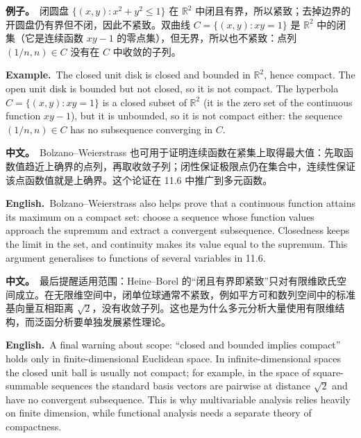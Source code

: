 \documentclass[UTF8,11pt,a4paper]{ctexart}
\newcommand{\BOTH}[2]{\par\noindent\textbf{中文。}\ #1\par\noindent\textbf{English.}\ #2\par}
\newcommand{\EX}[2]{\par\noindent\textbf{例子。}\ #1\par\noindent\textbf{Example.}\ #2\par}
\begin{document}
\EX{闭圆盘 $\{(x,y):x^2+y^2\le1\}$ 在 $\mathbb R^2$ 中闭且有界，所以紧致；去掉边界的开圆盘仍有界但不闭，因此不紧致。双曲线 $C=\{(x,y):xy=1\}$ 是 $\mathbb R^2$ 中的闭集（它是连续函数 $xy-1$ 的零点集），但无界，所以也不紧致：点列 $(1/n,n)\in C$ 没有在 $C$ 中收敛的子列。}{The closed unit disk is closed and bounded in $\mathbb R^2$, hence compact. The open unit disk is bounded but not closed, so it is not compact. The hyperbola $C=\{(x,y):xy=1\}$ is a closed subset of $\mathbb R^2$ (it is the zero set of the continuous function $xy-1$), but it is unbounded, so it is not compact either: the sequence $(1/n,n)\in C$ has no subsequence converging in $C$.}
\BOTH{Bolzano--Weierstrass 也可用于证明连续函数在紧集上取得最大值：先取函数值趋近上确界的点列，再取收敛子列；闭性保证极限点仍在集合中，连续性保证该点函数值就是上确界。这个论证在 11.6 中推广到多元函数。}{Bolzano--Weierstrass also helps prove that a continuous function attains its maximum on a compact set: choose a sequence whose function values approach the supremum and extract a convergent subsequence. Closedness keeps the limit in the set, and continuity makes its value equal to the supremum. This argument generalises to functions of several variables in 11.6.}
\BOTH{最后提醒适用范围：Heine--Borel 的“闭且有界即紧致”只对有限维欧氏空间成立。在无限维空间中，闭单位球通常不紧致，例如平方可和数列空间中的标准基向量互相距离 $\sqrt2$，没有收敛子列。这也是为什么多元分析大量使用有限维结构，而泛函分析要单独发展紧性理论。}{A final warning about scope: “closed and bounded implies compact” holds only in finite-dimensional Euclidean space. In infinite-dimensional spaces the closed unit ball is usually not compact; for example, in the space of square-summable sequences the standard basis vectors are pairwise at distance $\sqrt2$ and have no convergent subsequence. This is why multivariable analysis relies heavily on finite dimension, while functional analysis needs a separate theory of compactness.}
\end{document}
